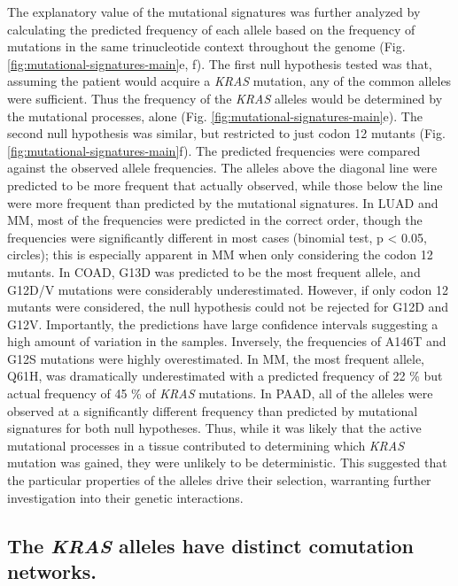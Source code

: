 \documentclass[english, 12pt, letterpaper]{article}
\newcommand{\KRAS}{\emph{KRAS}}
\begin{document}
The explanatory value of the mutational signatures was further analyzed by calculating the predicted frequency of each allele based on the frequency of mutations in the same trinucleotide context throughout the genome (Fig. \ref{fig:mutational-signatures-main}e, f).
The first null hypothesis tested was that, assuming the patient would acquire a \KRAS{} mutation, any of the common alleles were sufficient. Thus the frequency of the \KRAS{} alleles would be determined by the mutational processes, alone (Fig. \ref{fig:mutational-signatures-main}e).
The second null hypothesis was similar, but restricted to just codon 12 mutants (Fig. \ref{fig:mutational-signatures-main}f).
The predicted frequencies were compared against the observed allele frequencies.
The alleles above the diagonal line were predicted to be more frequent that actually observed, while those below the line were more frequent than predicted by the mutational signatures.
In LUAD and MM, most of the frequencies were predicted in the correct order, though the frequencies were significantly different in most cases (binomial test, p < 0.05, circles); this is especially apparent in MM when only considering the codon 12 mutants.
In COAD, G13D was predicted to be the most frequent allele, and G12D/V mutations were considerably underestimated.
However, if only codon 12 mutants were considered, the null hypothesis could not be rejected for G12D and G12V.
Importantly, the predictions have large confidence intervals suggesting a high amount of variation in the samples.
Inversely, the frequencies of A146T and G12S mutations were highly overestimated.
In MM, the most frequent allele, Q61H, was dramatically underestimated with a predicted frequency of 22 \% but actual frequency of 45 \% of \KRAS{} mutations.
In PAAD, all of the alleles were observed at a significantly different frequency than predicted by mutational signatures for both null hypotheses.
Thus, while it was likely that the active mutational processes in a tissue contributed to determining which \KRAS{} mutation was gained, they were unlikely to be deterministic.
This suggested that the particular properties of the alleles drive their selection, warranting further investigation into their genetic interactions.


\subsection*{The \KRAS{} alleles have distinct comutation networks.}
\end{document}
